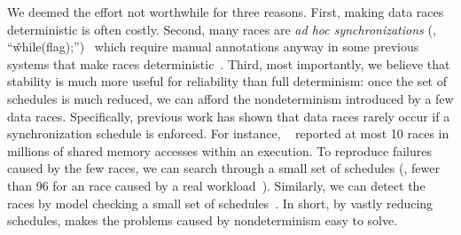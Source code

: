 We deemed the effort not worthwhile for three reasons. First, making data
races deterministic is often costly.  Second, many races are \emph{ad hoc
  synchronizations} (\eg, ``\v{while(flag)};'')~\cite{syncfinder:osdi10}
which require manual annotations anyway in some previous systems that make
races deterministic~\cite{dthreads:sosp11, grace:oopsla09}.  Third, most
importantly, we believe that stability is much more useful for reliability
than full determinism: once the set of schedules is much reduced, we can
afford the nondeterminism introduced by a few data races.  Specifically,
previous work has shown that data races rarely occur if a synchronization
schedule is enforced.  For instance, \peregrine~\cite{peregrine:sosp11}
reported at most 10 races in millions of shared memory accesses
within an execution.  To reproduce failures caused by the few races, we
can search through a small set of schedules (\eg, fewer than 96 for
an \apache race caused by a real workload~\cite{pres:sosp09}).  Similarly,
we can detect the races by model checking a small set of
schedules~\cite{musuvathi:chess:osdi08}. In short, by vastly reducing
schedules, \smt makes the problems caused by nondeterminism easy to solve.



